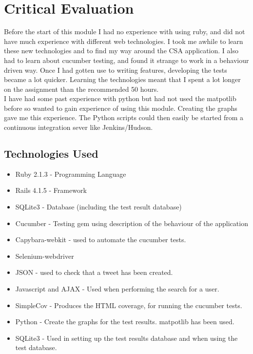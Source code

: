 \documentclass[10pt,a4paper,titlepage]{article}
\begin{document}
\section{Critical Evaluation}

Before the start of this module I had no experience with using ruby, and did not have much experience with different web technologies. I took me awhile to learn these new technologies and to find my way around the CSA application. I also had to learn about cucumber testing, and found it strange to work in a behaviour driven way. Once I had gotten use to writing features, developing the tests became a lot quicker. Learning the technologies meant that I spent a lot longer on the assignment than the recommended 50 hours.\\

I have had some past experience with python but had not used the matpotlib before so wanted to gain experience of using this module. Creating the graphs gave me this experience. The Python scripts could then easily be started from a continuous integration sever like Jenkins/Hudson.\\


\subsection{Technologies Used}
\begin{itemize}
\item Ruby 2.1.3 - Programming Language
\item Rails 4.1.5 - Framework
\item SQLite3 - Database (including the test result database)
\item Cucumber - Testing gem using description of the behaviour of the application
\item Capybara-webkit - used to automate the cucumber tests.
\item Selenium-webdriver
\item JSON - used to check that a tweet has been created.
\item Javascript and AJAX - Used when performing the search for a user.
\item SimpleCov - Produces the HTML coverage, for running the cucumber tests.
\item Python - Create the graphs for the test results. matpotlib has been used.
\item SQLite3 - Used in setting up the test results database and when using the test database.
\end{itemize}
\end{document}
